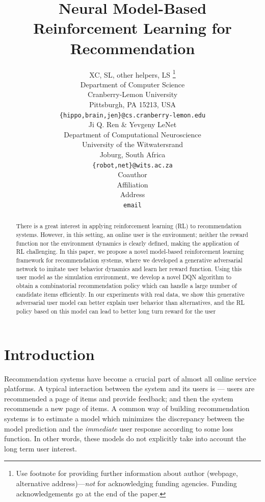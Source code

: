 \documentclass{article} %
\title{Neural Model-Based Reinforcement Learning for Recommendation}
\author{
XC, SL, other helpers, LS
\thanks{ Use footnote for providing further information
about author (webpage, alternative address)---\emph{not} for acknowledging
funding agencies.  Funding acknowledgements go at the end of the paper.} \\
Department of Computer Science\\
Cranberry-Lemon University\\
Pittsburgh, PA 15213, USA \\
\texttt{\{hippo,brain,jen\}@cs.cranberry-lemon.edu} \\
\And
Ji Q. Ren \& Yevgeny LeNet \\
Department of Computational Neuroscience \\
University of the Witwatersrand \\
Joburg, South Africa \\
\texttt{\{robot,net\}@wits.ac.za} \\
\AND
Coauthor \\
Affiliation \\
Address \\
\texttt{email}
}
\newcommand{\xinshi}[1]{{\color{black}{#1}}}
\begin{document}
\maketitle

\begin{abstract}
 There is a great interest in applying reinforcement learning (RL) to recommendation systems. However, in this setting, an online user is the environment; neither the reward function nor the environment dynamics is clearly defined, making the application of RL challenging. 
 In this paper, we propose a novel model-based reinforcement learning framework for recommendation systems, where we developed a generative adversarial network to imitate user behavior dynamics and learn her reward function. Using this user model as the simulation environment, we develop a novel DQN algorithm to obtain a combinatorial recommendation policy which can handle a large number of candidate items efficiently. 
 In our experiments with real data, we show this generative adversarial user model can better explain user behavior than alternatives, and the RL policy based on this model can lead to better long turn reward for the user \xinshi{and higher click rate for the system.}
\end{abstract}
\vspace{-3mm}
\section{Introduction}
\vspace{-3mm}
        \setlength{\abovedisplayskip}{4pt}
        \setlength{\abovedisplayshortskip}{1pt}
        \setlength{\belowdisplayskip}{4pt}
        \setlength{\belowdisplayshortskip}{1pt}
        \setlength{\jot}{3pt}
        \setlength{\textfloatsep}{6pt}	

Recommendation systems have become a crucial part of almost all online service platforms. A typical interaction between the
system and its users is --- users are recommended a page of items
and provide feedback; and then the system recommends a new
page of items. A common way of building recommendation systems is to estimate a model which minimizes the discrepancy between the model prediction and the \emph{immediate} user response according to some loss function. In other words, these models do not explicitly take into account the long term user interest. \xinshi{However, user's interest can evolve over time based on what she observes, and the recommender's action may significantly influence such evolution. In some sense the recommender is guiding users' interest by displaying particular items and hidding the rest. Thus, a recommendation strategy which takes user's long term interest into account is more favorable. 
} 
\end{document}
